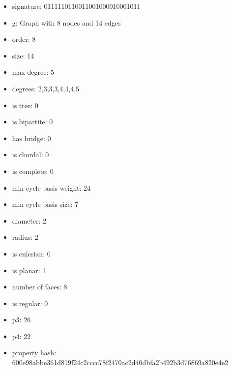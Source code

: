 \begin{itemize}
\item signature: 0111110110011001000010001011
\item g: Graph with 8 nodes and 14 edges
\item order: 8
\item size: 14
\item max degree: 5
\item degrees: 2,3,3,3,4,4,4,5
\item is tree: 0
\item is bipartite: 0
\item has bridge: 0
\item is chordal: 0
\item is complete: 0
\item min cycle basis weight: 24
\item min cycle basis size: 7
\item diameter: 2
\item radius: 2
\item is eulerian: 0
\item is planar: 1
\item number of faces: 8
\item is regular: 0
\item p3: 26
\item p4: 22
\item property hash: 600e98abbe361d819f24c2cccc78f2470ac2d40dbfa2b492b3d76869a820e4e2
\end{itemize}
\newpage
\begin{figure}
\end{figure}
